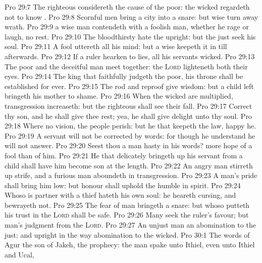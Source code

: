 \vs Pro 29:7 The righteous considereth the cause of the poor:  the wicked regardeth not to know .
\vs Pro 29:8 Scornful men bring a city into a snare: but wise  turn away wrath.
\vs Pro 29:9  a wise man contendeth with a foolish man, whether he rage or laugh,  no rest.
\vs Pro 29:10 The bloodthirsty hate the upright: but the just seek his soul.
\vs Pro 29:11 A fool uttereth all his mind: but a wise  keepeth it in till afterwards.
\vs Pro 29:12 If a ruler hearken to lies, all his servants  wicked.
\vs Pro 29:13 The poor and the deceitful man meet together: the \textsc{Lord} lighteneth both their eyes.
\vs Pro 29:14 The king that faithfully judgeth the poor, his throne shall be established for ever.
\vs Pro 29:15 The rod and reproof give wisdom: but a child left  bringeth his mother to shame.
\vs Pro 29:16 When the wicked are multiplied, transgression increaseth: but the righteous shall see their fall.
\vs Pro 29:17 Correct thy son, and he shall give thee rest; yea, he shall give delight unto thy soul.
\vs Pro 29:18 Where  no vision, the people perish: but he that keepeth the law, happy  he.
\vs Pro 29:19 A servant will not be corrected by words: for though he understand he will not answer.
\vs Pro 29:20 Seest thou a man  hasty in his words?  more hope of a fool than of him.
\vs Pro 29:21 He that delicately bringeth up his servant from a child shall have him become  son at the length.
\vs Pro 29:22 An angry man stirreth up strife, and a furious man aboundeth in transgression.
\vs Pro 29:23 A man's pride shall bring him low: but honour shall uphold the humble in spirit.
\vs Pro 29:24 Whoso is partner with a thief hateth his own soul: he heareth cursing, and bewrayeth  not.
\vs Pro 29:25 The fear of man bringeth a snare: but whoso putteth his trust in the \textsc{Lord} shall be safe.
\vs Pro 29:26 Many seek the ruler's favour; but  man's judgment  from the \textsc{Lord}.
\vs Pro 29:27 An unjust man  an abomination to the just: and  upright in the way  abomination to the wicked.
\vs Pro 30:1 The words of Agur the son of Jakeh,  the prophecy: the man spake unto Ithiel, even unto Ithiel and Ucal,
